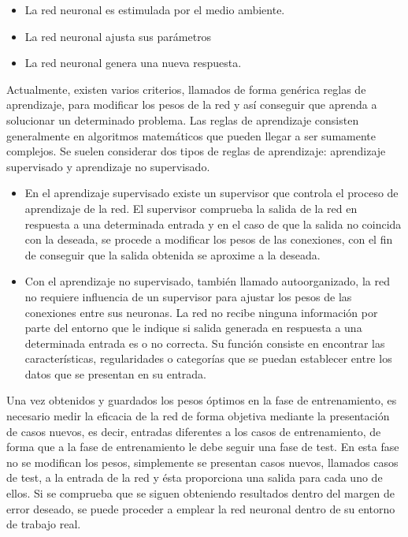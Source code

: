 \documentclass[a4paper, 12pt, oneside]{book}
\begin{document}
\begin{itemize}
\item La red neuronal es estimulada por el medio ambiente.
\item La red neuronal ajusta sus parámetros
\item La red neuronal genera una nueva respuesta.
\end{itemize}

Actualmente, existen varios criterios, llamados de forma genérica reglas de aprendizaje, para modificar los pesos de la red y así conseguir que aprenda a solucionar un determinado problema. Las reglas de aprendizaje consisten generalmente en algoritmos matemáticos que pueden llegar a ser sumamente complejos. Se suelen considerar dos tipos de reglas de aprendizaje: aprendizaje supervisado y aprendizaje no supervisado.

\begin{itemize}
\item En el aprendizaje supervisado existe un supervisor que controla el proceso de aprendizaje de la red. El supervisor comprueba la salida de la red en respuesta a una determinada entrada y en el caso de que la salida no coincida con la deseada, se procede a modificar los pesos de las conexiones, con el fin de conseguir que la salida obtenida se aproxime a la deseada.
\item Con el aprendizaje no supervisado, también llamado autoorganizado, la red no requiere influencia de un supervisor para ajustar los pesos de las conexiones entre sus neuronas. La red no recibe ninguna información por parte del entorno que le indique si salida generada en respuesta a una determinada entrada es o no correcta. Su función consiste en encontrar las características, regularidades o categorías que se puedan establecer entre los datos que se presentan en su entrada.
\end{itemize}

Una vez obtenidos y guardados los pesos óptimos en la fase de entrenamiento, es necesario medir la eficacia de la red de forma objetiva mediante la presentación de casos nuevos, es decir, entradas diferentes a los casos de entrenamiento, de forma que a la fase de entrenamiento le debe seguir una fase de test. En esta fase no se modifican los pesos, simplemente se presentan casos nuevos, llamados casos de test, a la entrada de la red y ésta proporciona una salida para cada uno de ellos. Si se comprueba que se siguen obteniendo resultados dentro del margen de error deseado, se puede proceder a emplear la red neuronal dentro de su entorno de trabajo real.
\end{document}
